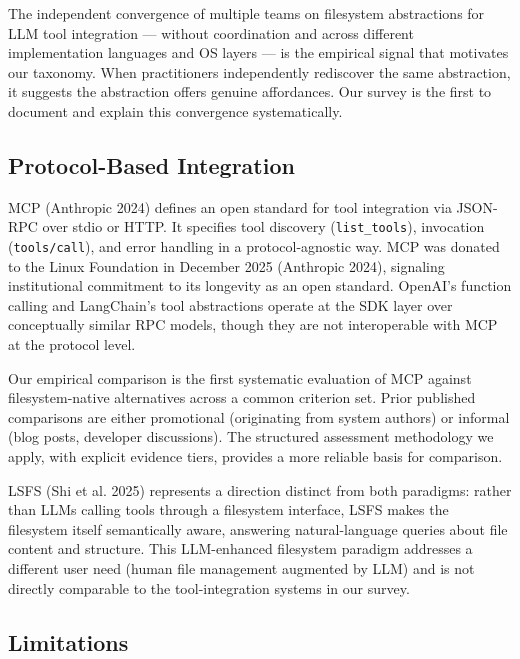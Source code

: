 \documentclass[
  11pt,
]{article}
\begin{document}
The independent convergence of multiple teams on filesystem abstractions
for LLM tool integration --- without coordination and across different
implementation languages and OS layers --- is the empirical signal that
motivates our taxonomy. When practitioners independently rediscover the
same abstraction, it suggests the abstraction offers genuine
affordances. Our survey is the first to document and explain this
convergence systematically.

\hypertarget{protocol-based-integration}{%
\subsection{Protocol-Based
Integration}\label{protocol-based-integration}}

MCP (Anthropic 2024) defines an open standard for tool integration via
JSON-RPC over stdio or HTTP. It specifies tool discovery
(\texttt{list\_tools}), invocation (\texttt{tools/call}), and error
handling in a protocol-agnostic way. MCP was donated to the Linux
Foundation in December 2025 (Anthropic 2024), signaling institutional
commitment to its longevity as an open standard. OpenAI's function
calling and LangChain's tool abstractions operate at the SDK layer over
conceptually similar RPC models, though they are not interoperable with
MCP at the protocol level.

Our empirical comparison is the first systematic evaluation of MCP
against filesystem-native alternatives across a common criterion set.
Prior published comparisons are either promotional (originating from
system authors) or informal (blog posts, developer discussions). The
structured assessment methodology we apply, with explicit evidence
tiers, provides a more reliable basis for comparison.

LSFS (Shi et al. 2025) represents a direction distinct from both
paradigms: rather than LLMs calling tools through a filesystem
interface, LSFS makes the filesystem itself semantically aware,
answering natural-language queries about file content and structure.
This LLM-enhanced filesystem paradigm addresses a different user need
(human file management augmented by LLM) and is not directly comparable
to the tool-integration systems in our survey.

\hypertarget{limitations}{%
\subsection{Limitations}\label{limitations}}
\end{document}
